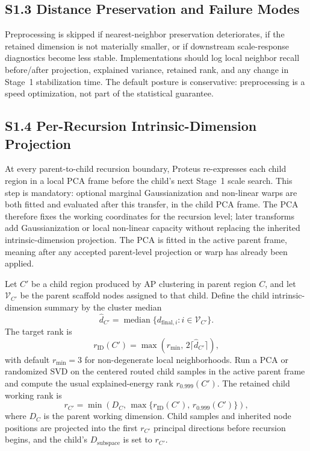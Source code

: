 \documentclass[11pt]{article}
\begin{document}
\subsection*{S1.3 Distance Preservation and Failure Modes}
Preprocessing is skipped if nearest-neighbor preservation deteriorates, if the retained dimension is not materially smaller, or if downstream scale-response diagnostics become less stable. Implementations should log local neighbor recall before/after projection, explained variance, retained rank, and any change in Stage~1 stabilization time. The default posture is conservative: preprocessing is a speed optimization, not part of the statistical guarantee.

\subsection*{S1.4 Per-Recursion Intrinsic-Dimension Projection}
At every parent-to-child recursion boundary, Proteus re-expresses each child region in a local PCA frame before the child's next Stage~1 scale search. This step is mandatory: optional marginal Gaussianization and non-linear warps are both fitted and evaluated after this transfer, in the child PCA frame. The PCA therefore fixes the working coordinates for the recursion level; later transforms add Gaussianization or local non-linear capacity without replacing the inherited intrinsic-dimension projection. The PCA is fitted in the active parent frame, meaning after any accepted parent-level projection or warp has already been applied.

Let $C'$ be a child region produced by AP clustering in parent region $C$, and let $\mathcal V_{C'}$ be the parent scaffold nodes assigned to that child. Define the child intrinsic-dimension summary by the cluster median
\[
\widehat d_{C'}=
\operatorname{median}\{d_{\mathrm{final},i}:i\in\mathcal V_{C'}\}.
\]
The target rank is
\[
r_{\mathrm{ID}}(C')=
\max\!\left(r_{\min},\,2\lceil \widehat d_{C'}\rceil\right),
\]
with default $r_{\min}=3$ for non-degenerate local neighborhoods. Run a PCA or randomized SVD on the centered routed child samples in the active parent frame and compute the usual explained-energy rank $r_{0.999}(C')$. The retained child working rank is
\[
r_{C'}=
\min\!\left(D_C,\,
\max\{r_{\mathrm{ID}}(C'),\,r_{0.999}(C')\}
\right),
\]
where $D_C$ is the parent working dimension. Child samples and inherited node positions are projected into the first $r_{C'}$ principal directions before recursion begins, and the child's $D_{\mathrm{subspace}}$ is set to $r_{C'}$.
\end{document}
